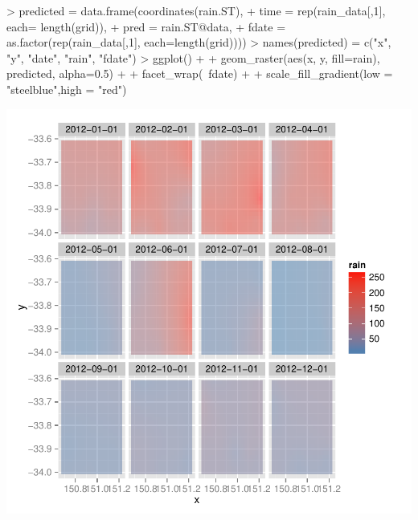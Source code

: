 \documentclass[12pt]{article}
\begin{document}
\begin{Schunk}
\begin{Sinput}
> predicted = data.frame(coordinates(rain.ST), 
+                        time = rep(rain_data[,1], each= length(grid)),
+                        pred = rain.ST@data, 
+                        fdate = as.factor(rep(rain_data[,1], each=length(grid))))
> names(predicted) = c("x", "y", "date", "rain", "fdate")
> ggplot() + 
+   geom_raster(aes(x, y, fill=rain), predicted, alpha=0.5) +
+   facet_wrap(~fdate) +
+   scale_fill_gradient(low = "steelblue",high = "red") 
\end{Sinput}
\end{Schunk}
\includegraphics{BOMdataRipper-overview-016}
\end{document}
